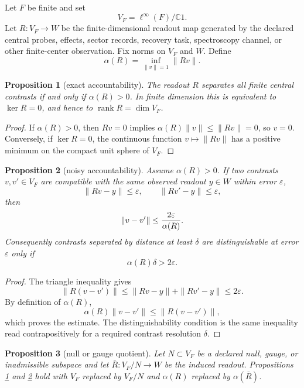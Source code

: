 \documentclass[12pt]{article}
\newtheorem{proposition}{Proposition}
\theoremstyle{remark}
\newcommand{\rank}{\operatorname{rank}}
\begin{document}
Let \(F\) be finite and set
\[
  V_F=\ell^\infty(F)/\mathbb C1 .
\]
Let \(R:V_F\to W\) be the finite-dimensional readout map generated by the
declared central probes, effects, sector records, recovery task, spectroscopy
channel, or other finite-center observation.  Fix norms on \(V_F\) and \(W\).
Define
\[
  \alpha(R)=\inf_{\|v\|=1}\|Rv\|.
\]

\begin{proposition}[exact accountability]
\label{prop:exact}
The readout \(R\) separates all finite central contrasts if and only if
\(\alpha(R)>0\).  In finite dimension this is equivalent to \(\ker R=0\), and
hence to \(\rank R=\dim V_F\).
\end{proposition}

\begin{proof}
If \(\alpha(R)>0\), then \(Rv=0\) implies
\(\alpha(R)\|v\|\le\|Rv\|=0\), so \(v=0\).  Conversely, if \(\ker R=0\), the
continuous function \(v\mapsto\|Rv\|\) has a positive minimum on the compact
unit sphere of \(V_F\).
\end{proof}

\begin{proposition}[noisy accountability]
\label{prop:noisy}
Assume \(\alpha(R)>0\).  If two contrasts \(v,v'\in V_F\) are compatible with
the same observed readout \(y\in W\) within error \(\varepsilon\),
\[
  \|Rv-y\|\le\varepsilon,\qquad
  \|Rv'-y\|\le\varepsilon,
\]
then
\[
  \|v-v'\|\le {2\varepsilon\over\alpha(R)}.
\]
Consequently contrasts separated by distance at least \(\delta\) are
distinguishable at error \(\varepsilon\) only if
\[
  \alpha(R)\delta>2\varepsilon .
\]
\end{proposition}

\begin{proof}
The triangle inequality gives
\[
  \|R(v-v')\|
  \le \|Rv-y\|+\|Rv'-y\|
  \le 2\varepsilon .
\]
By definition of \(\alpha(R)\),
\[
  \alpha(R)\|v-v'\|\le\|R(v-v')\|,
\]
which proves the estimate.  The distinguishability condition is the same
inequality read contrapositively for a required contrast resolution \(\delta\).
\end{proof}

\begin{proposition}[null or gauge quotient]
Let \(N\subset V_F\) be a declared null, gauge, or inadmissible subspace and
let \(\bar R:V_F/N\to W\) be the induced readout.  Propositions
\ref{prop:exact} and \ref{prop:noisy} hold with \(V_F\) replaced by \(V_F/N\)
and \(\alpha(R)\) replaced by \(\alpha(\bar R)\).
\end{proposition}
\end{document}
